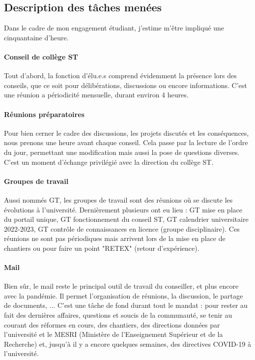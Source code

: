 \documentclass{article}
\begin{document}
\subsection{Description des tâches menées}
Dans le cadre de mon engagement étudiant, j'estime m'être impliqué une cinquantaine d'heure.

\paragraph{Conseil de collège ST} Tout d'abord, la fonction d'élu.e.s comprend évidemment la présence lors des conseils, que ce soit pour délibérations, discussions ou encore informations. C'est une réunion a périodicité mensuelle, durant environ 4 heures.

\paragraph{Réunions préparatoires} Pour bien cerner le cadre des discussions, les projets discutés et les conséquences, nous prenons une heure avant chaque conseil. Cela passe par la lecture de l'ordre du jour, permettant une modification mais aussi la pose de questions diverses. C'est un moment d'échange privilégié avec la direction du collège ST. 

\paragraph{Groupes de travail} Aussi nommés GT, les groupes de travail sont des réunions où se discute les évolutions à l'université. Dernièrement plusieurs ont eu lieu : GT mise en place du portail unique, GT fonctionnement du conseil ST, GT calendrier  universitaire 2022-2023, GT contrôle de connaissances en licence (groupe disciplinaire). Ces réunions ne sont pas périodiques mais arrivent lors de la mise en place de chantiers ou pour faire un point "RETEX" (retour d'expérience).

\paragraph{Mail} Bien sûr, le mail reste le principal outil de travail du conseiller, et plus encore avec la pandémie. Il permet l'organisation de réunions, la discussion, le partage de documents, ... C'est une tâche de fond durant tout le mandat : pour rester au fait des dernières affaires, questions et soucis de la communauté, se tenir au courant des réformes en cours, des chantiers, des directions données par l'université et le MESRI (Ministère de l'Enseignement Supérieur et de la Recherche) et, jusqu'à il y a encore quelques semaines, des directives COVID-19 à l'université.
\end{document}
